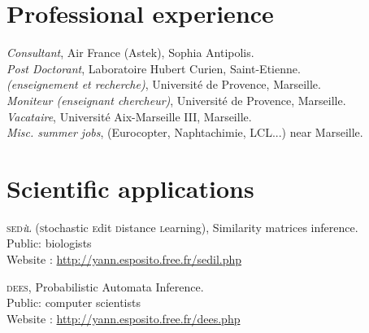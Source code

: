 


\reversemarginpar



\afficheContactInfos

\section*{Professional experience}

\noindent{}\emph{Consultant}, Air France (Astek), Sophia Antipolis.\\
\emph{Post Doctorant}, Laboratoire Hubert Curien, Saint-Etienne.\\
\emph{ {\footnotesize (enseignement et recherche)}}, Université de Provence, Marseille.\\
\emph{Moniteur (enseignant \amper{} chercheur)}, Université de Provence, Marseille.\\
\emph{Vacataire}, Université Aix-Marseille III, Marseille.\\
\emph{Misc. summer jobs}, {\footnotesize (Eurocopter, Naphtachimie, LCL...) } near Marseille.

\section*{Scientific applications}
\textsc{sed}\textit{\footnotesize i}\textsc{l} ({\textsc{\color{darkred}s}tochastic 
\textsc{\color{darkred}e}dit
\textsc{\color{darkred}d}{\color{darkred}i}stance
\textsc{\color{darkred}l}earning}), 
Similarity matrices inference.\\
{\footnotesize \phantom{espace}Public: biologists}\\
{\footnotesize \phantom{espace}Website : \href{http://yann.esposito.free.fr/sedil.php}{http://yann.esposito.free.fr/sedil.php}}

\textsc{dees}, Probabilistic Automata Inference.\\
{\footnotesize \phantom{espace}Public: computer scientists}\\
{\footnotesize \phantom{espace}Website : \href{http://yann.esposito.free.fr/dees.php}{http://yann.esposito.free.fr/dees.php}}

